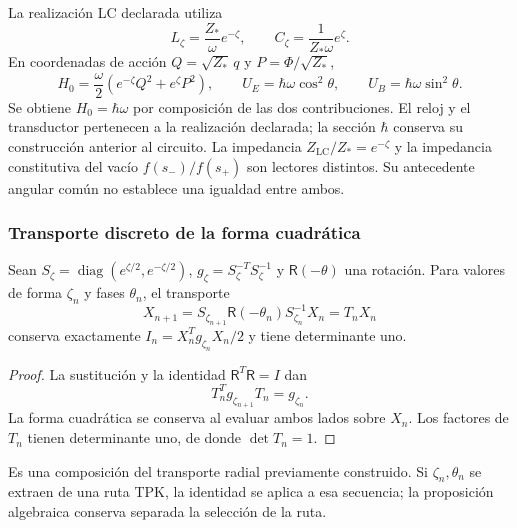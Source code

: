La realización LC declarada utiliza
\begin{equation}
 L_\zeta=\frac{Z_*}{\omega}e^{-\zeta},\qquad
 C_\zeta=\frac{1}{Z_*\omega}e^\zeta.
 \label{md:hib:lc}
\end{equation}
En coordenadas de acción $Q=\sqrt{Z_*}\,q$ y
$P=\Phi/\sqrt{Z_*}$,
\begin{equation}
 H_0=\frac{\omega}{2}
 \left(e^{-\zeta}Q^2+e^\zeta P^2\right),\qquad
 U_E=\hbar\omega\cos^2\theta,\qquad
 U_B=\hbar\omega\sin^2\theta.
 \label{md:hib:energia-elipse}
\end{equation}
Se obtiene $H_0=\hbar\omega$ por composición de las dos contribuciones.
El reloj y el transductor pertenecen a la realización declarada; la sección
$\hbar$ conserva su construcción anterior al circuito. La impedancia
$Z_{\mathrm{LC}}/Z_*=e^{-\zeta}$ y la impedancia constitutiva del vacío
$f(s_-)/f(s_+)$ son lectores distintos. Su antecedente angular común no
establece una igualdad entre ambos.

\subsubsection{Transporte discreto de la forma cuadrática}
\label{md:hib:transporte-discreto}

\begin{proposition}
\label{md:hib:proposicion-discreta}
Sean $S_\zeta=\operatorname{diag}(e^{\zeta/2},e^{-\zeta/2})$,
$g_\zeta=S_\zeta^{-T}S_\zeta^{-1}$ y
$\mathsf R(-\theta)$ una rotación. Para valores de forma $\zeta_n$ y
fases $\theta_n$, el transporte
\begin{equation}
 X_{n+1}=S_{\zeta_{n+1}}\mathsf R(-\theta_n)S_{\zeta_n}^{-1}X_n
 =T_nX_n
 \label{md:hib:transporte}
\end{equation}
conserva exactamente
$I_n=X_n^Tg_{\zeta_n}X_n/2$ y tiene determinante uno.
\end{proposition}
\begin{proof}
La sustitución y la identidad $\mathsf R^T\mathsf R=I$ dan
\begin{equation}
 T_n^Tg_{\zeta_{n+1}}T_n=g_{\zeta_n}.
 \label{md:hib:isometria-transportada}
\end{equation}
La forma cuadrática se conserva al evaluar ambos lados sobre $X_n$.
Los factores de $T_n$ tienen determinante uno, de donde
$\det T_n=1$.
\end{proof}
Es una composición del transporte radial previamente construido. Si
$\zeta_n,\theta_n$ se extraen de una ruta TPK, la identidad se aplica a
esa secuencia; la proposición algebraica conserva separada la selección
de la ruta.

